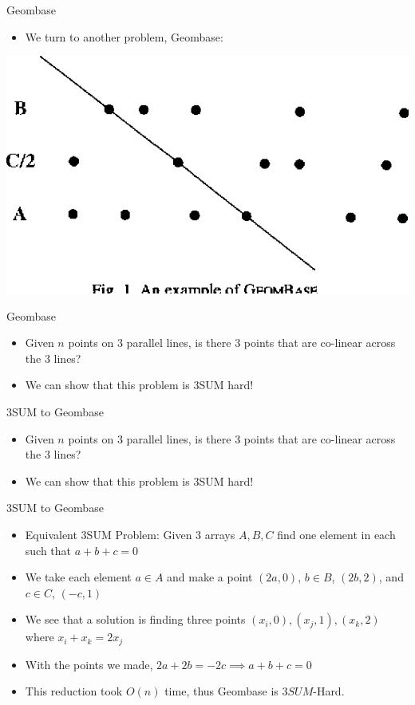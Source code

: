 \documentclass[aspectratio=169]{beamer}
\begin{document}
\begin{frame}{Geombase}
\begin{itemize}
    \item We turn to another problem, Geombase:
\end{itemize}
\begin{center}
    \includegraphics[width=.8\textwidth]{image.png}
\end{center}
\end{frame}

\begin{frame}{Geombase}
\begin{itemize}
    \item Given $n$ points on 3 parallel lines, is there 3 points that are co-linear across the 3 lines? \pause 
    \item We can show that this problem is \textsc{3SUM} hard!
\end{itemize}
\end{frame}

\begin{frame}{3SUM to Geombase}
\begin{itemize}
    \item Given $n$ points on 3 parallel lines, is there 3 points that are co-linear across the 3 lines? \pause 
    \item We can show that this problem is \textsc{3SUM} hard!
\end{itemize}
\end{frame}

\begin{frame}{3SUM to Geombase}
\begin{itemize}
    \item Equivalent 3SUM Problem: Given 3 arrays $A,B,C$ find one element in each such that $a+b+c=0$ \pause
    \item We take each element $a \in A$ and make a point $(2a,0)$, $b \in B$, $(2b,2)$, and $c \in C$, $(-c,1)$ \pause
    \item We see that a solution is finding three points $(x_i, 0), (x_j, 1), (x_k, 2)$ where $x_i + x_k = 2x_j$ \pause
    \item With the points we made, $2a + 2b = -2c \implies a + b + c = 0$ \pause
    \item This reduction took $O(n)$ time, thus Geombase is $3SUM$-Hard.
\end{itemize}
\end{frame}
\end{document}
